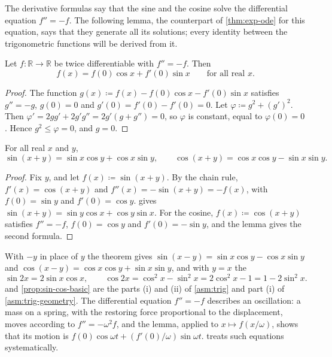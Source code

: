 The derivative formulas say that the sine and the cosine solve the differential equation $f''=-f$. The following lemma, the counterpart of \cref{thm:exp-ode} for this equation, says that they generate all its solutions; every identity between the trigonometric functions will be derived from it.

\begin{lemma}
\label{lem:harmonic-unique}
Let $f\colon\mathbb R\to\mathbb R$ be twice differentiable with $f''=-f$. Then
\[
f(x)=f(0)\cos x+f'(0)\sin x\qquad\text{for all real }x .
\]
\end{lemma}

\begin{proof}
The function $g(x)\coloneqq f(x)-f(0)\cos x-f'(0)\sin x$ satisfies $g''=-g$, $g(0)=0$ and $g'(0)=f'(0)-f'(0)=0$. Let $\varphi\coloneqq g^2+(g')^2$. Then $\varphi'=2gg'+2g'g''=2g'(g+g'')=0$, so $\varphi$ is constant, equal to $\varphi(0)=0$. Hence $g^2\le\varphi=0$, and $g=0$.
\end{proof}

\begin{theorem}
\label{thm:addition}
For all real $x$ and $y$,
\[
\sin(x+y)=\sin x\cos y+\cos x\sin y,\qquad\cos(x+y)=\cos x\cos y-\sin x\sin y .
\]
\end{theorem}

\begin{proof}
Fix $y$, and let $f(x)\coloneqq\sin(x+y)$. By the chain rule, $f'(x)=\cos(x+y)$ and $f''(x)=-\sin(x+y)=-f(x)$, with $f(0)=\sin y$ and $f'(0)=\cos y$.  gives $\sin(x+y)=\sin y\cos x+\cos y\sin x$. For the cosine, $f(x)\coloneqq\cos(x+y)$ satisfies $f''=-f$, $f(0)=\cos y$ and $f'(0)=-\sin y$, and the lemma gives the second formula.
\end{proof}

With $-y$ in place of $y$ the theorem gives $\sin(x-y)=\sin x\cos y-\cos x\sin y$ and $\cos(x-y)=\cos x\cos y+\sin x\sin y$, and with $y=x$ the 
\[
\sin2x=2\sin x\cos x,\qquad\cos2x=\cos^2x-\sin^2x=2\cos^2x-1=1-2\sin^2x .
\]
 and \cref{prop:sin-cos-basic} are the parts (i) and (ii) of \cref{asm:trig} and part (i) of \cref{asm:trig-geometry}. The differential equation $f''=-f$ describes an oscillation: a mass on a spring, with the restoring force proportional to the displacement, moves according to $f''=-\omega^2f$, and the lemma, applied to $x\mapsto f(x/\omega)$, shows that its motion is $f(0)\cos\omega t+(f'(0)/\omega)\sin\omega t$.  treats such equations systematically.


